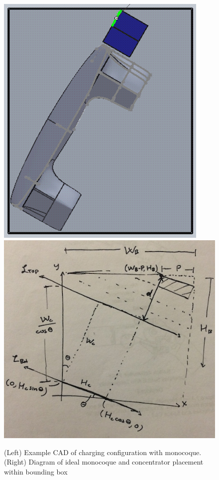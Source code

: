 \documentclass[reqno, 11pt, final]{article}
\begin{document}
\begin{figure}[h]
	\includegraphics[scale=0.5]{charging_configs_fittingconcentratorsCADEx}
	\includegraphics[scale=0.5]{charging_configs_fittingconcentratorsschematic}
	\caption{(Left) Example CAD of charging configuration with monocoque. (Right) Diagram of ideal monocoque and concentrator placement within bounding box}
\end{figure}
\end{document}
